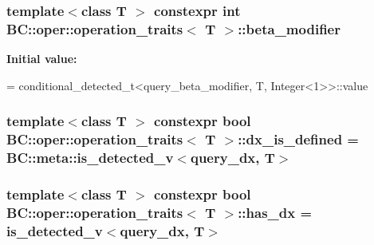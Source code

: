 \subsubsection[{\texorpdfstring{beta\+\_\+modifier}{beta_modifier}}]{\setlength{\rightskip}{0pt plus 5cm}template$<$class T $>$ constexpr int {\bf B\+C\+::oper\+::operation\+\_\+traits}$<$ T $>$\+::beta\+\_\+modifier\hspace{0.3cm}{\ttfamily [static]}}\hypertarget{structBC_1_1oper_1_1operation__traits_a0599e3b95b772ecf1119ace0f6e7731a}{}\label{structBC_1_1oper_1_1operation__traits_a0599e3b95b772ecf1119ace0f6e7731a}
{\bfseries Initial value\+:}
\begin{DoxyCode}
=
            conditional\_detected\_t<query\_beta\_modifier, T, Integer<1>>::value
\end{DoxyCode}
\subsubsection[{\texorpdfstring{dx\+\_\+is\+\_\+defined}{dx_is_defined}}]{\setlength{\rightskip}{0pt plus 5cm}template$<$class T $>$ constexpr bool {\bf B\+C\+::oper\+::operation\+\_\+traits}$<$ T $>$\+::dx\+\_\+is\+\_\+defined = B\+C\+::meta\+::is\+\_\+detected\+\_\+v$<$query\+\_\+dx, T$>$\hspace{0.3cm}{\ttfamily [static]}}\hypertarget{structBC_1_1oper_1_1operation__traits_a6e6485639213a9e1ea200b332d7cfa1e}{}\label{structBC_1_1oper_1_1operation__traits_a6e6485639213a9e1ea200b332d7cfa1e}
\subsubsection[{\texorpdfstring{has\+\_\+dx}{has_dx}}]{\setlength{\rightskip}{0pt plus 5cm}template$<$class T $>$ constexpr bool {\bf B\+C\+::oper\+::operation\+\_\+traits}$<$ T $>$\+::has\+\_\+dx = is\+\_\+detected\+\_\+v$<$query\+\_\+dx, T$>$\hspace{0.3cm}{\ttfamily [static]}}\hypertarget{structBC_1_1oper_1_1operation__traits_abc3cbcf7ca150885b496cb05f67947b9}{}\label{structBC_1_1oper_1_1operation__traits_abc3cbcf7ca150885b496cb05f67947b9}
